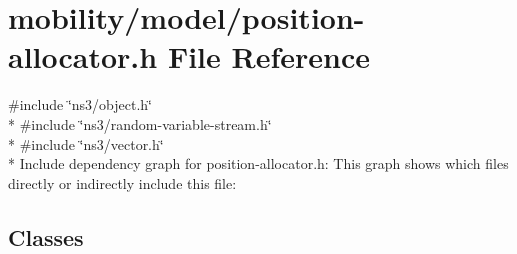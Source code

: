 \hypertarget{position-allocator_8h}{}\section{mobility/model/position-\/allocator.h File Reference}
\label{position-allocator_8h}
{\ttfamily \#include \char`\"{}ns3/object.\+h\char`\"{}}\\*
{\ttfamily \#include \char`\"{}ns3/random-\/variable-\/stream.\+h\char`\"{}}\\*
{\ttfamily \#include \char`\"{}ns3/vector.\+h\char`\"{}}\\*
Include dependency graph for position-\/allocator.h\+:
This graph shows which files directly or indirectly include this file\+:
\subsection*{Classes}
